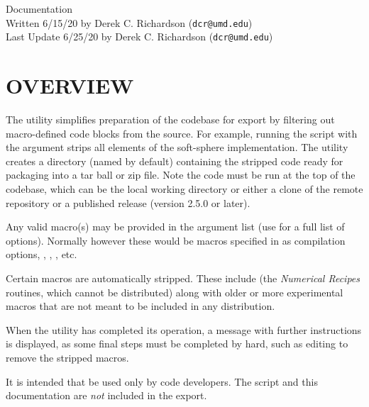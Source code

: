 



\begin{flushleft}

\huge{ Documentation}\\
\bigskip\bigskip
\Large{
Written 6/15/20 by Derek C. Richardson (\texttt{dcr@umd.edu})\\
\bigskip
Last Update 6/25/20 by Derek C. Richardson (\texttt{dcr@umd.edu})
} %

\end{flushleft}

\tableofcontents

\section{OVERVIEW}

The  utility simplifies preparation of the
 codebase for export by filtering out macro-defined code
blocks from the source. For example, running the script with the
argument  strips all elements of the soft-sphere
implementation. The utility creates a directory (named 
by default) containing the stripped code ready for packaging into a
tar ball or zip file. Note the code must be run at the top of the
codebase, which can be the local  working directory or
either a clone of the remote repository or a published release
(version 2.5.0 or later).

Any valid macro(s) may be provided in the argument list (use
 for a full list of options). Normally
however these would be macros specified in  as
compilation options, \eg {}, , , etc.

Certain macros are automatically stripped. These include 
(the \textit{Numerical Recipes} routines, which cannot be distributed)
along with older or more experimental macros that are not meant to be
included in any distribution.

When the utility has completed its operation, a message with further
instructions is displayed, as some final steps must be completed by
hard, such as editing  to remove the stripped
macros.

It is intended that  be used only by code
developers. The script and this documentation are \emph{not} included
in the export.

